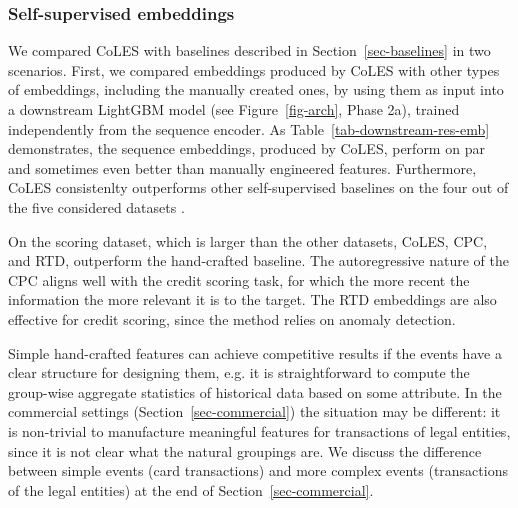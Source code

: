 \documentclass[sigconf]{acmart}
\newcommand{\revised}[1]{#1}
\begin{document}
\subsubsection{Self-supervised embeddings}

We compared CoLES with baselines described in Section~\ref{sec-baselines} in two scenarios.
% 
First, we compared embeddings produced by CoLES with other types of embeddings, including
the manually created ones, by using them as input into a downstream LightGBM model
(see Figure~\ref{fig-arch}, Phase 2a), trained independently from the sequence encoder.
% 
As Table~\ref{tab-downstream-res-emb} demonstrates, the sequence embeddings, produced
by CoLES, perform on par and sometimes even better than manually engineered features.
%
Furthermore, CoLES consistenlty outperforms other self-supervised baselines on \revised{
    the four out of the five considered datasets
}.

\revised{
    On the scoring dataset, which is larger than the other datasets, CoLES, CPC, and RTD, outperform the hand-crafted baseline.
    The autoregressive nature of the CPC aligns well with the credit scoring task, for which
    the more recent the information the more relevant it is to the target. The RTD embeddings
    are also effective for credit scoring, since the method relies on anomaly detection.

    Simple hand-crafted features can achieve competitive results if the events have a clear
    structure for designing them, e.g. it is straightforward to compute the group-wise aggregate
    statistics of historical data based on some attribute. In the commercial settings (Section~\ref{sec-commercial})
    the situation may be different: it is non-trivial to manufacture meaningful features for
    transactions of legal entities, since it is not clear what the natural groupings are. We
    discuss the difference between simple events (card transactions) and more complex events
    (transactions of the legal entities) at the end of Section~\ref{sec-commercial}.
}
\end{document}
